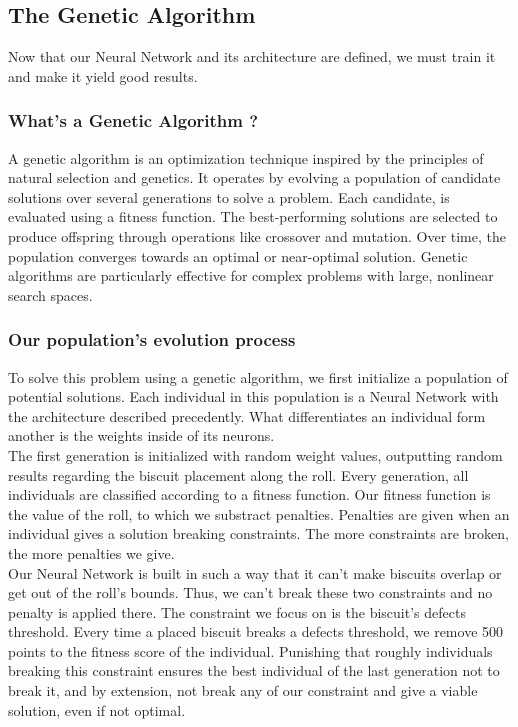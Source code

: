 \documentclass{modeleRapport}
\begin{document}
\subsection{The Genetic Algorithm}

Now that our Neural Network and its architecture are defined, we must train it and make it yield good results. 

\subsubsection{What's a Genetic Algorithm ?}

A genetic algorithm is an optimization technique inspired by the principles of natural selection and genetics.
It operates by evolving a population of candidate solutions over several generations to solve a problem. 
Each candidate, is evaluated using a fitness function. The best-performing solutions are selected to produce 
offspring through operations like crossover and mutation. Over time, the population converges towards an optimal or 
near-optimal solution. Genetic algorithms are particularly effective for complex problems with large, 
nonlinear search spaces.

\subsubsection{Our population's evolution process}

To solve this problem using a genetic algorithm, we first initialize a population of potential solutions. Each individual 
in this population is a Neural Network with the architecture described precedently. What differentiates an individual form 
another is the weights inside of its neurons.\\

The first generation is initialized with random weight values, outputting random results regarding the biscuit placement 
along the roll. Every generation, all individuals are classified according to a fitness function. Our fitness function is 
the value of the roll, to which we substract penalties. Penalties are given when an individual gives a solution breaking 
constraints. The more constraints are broken, the more penalties we give.\\

Our Neural Network is built in such a way that it can't make biscuits overlap or get out of the roll's bounds. Thus, we 
can't break these two constraints and no penalty is applied there. The constraint we focus on is the biscuit's defects 
threshold. Every time a placed biscuit breaks a defects threshold, we remove 500 points to the fitness score of the 
individual. Punishing that roughly individuals breaking this constraint ensures the best individual of the last generation 
not to break it, and by extension, not break any of our constraint and give a viable solution, even if not optimal.\\
\end{document}
